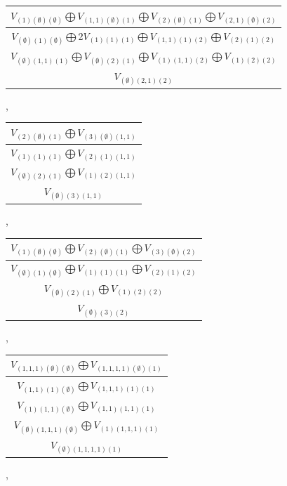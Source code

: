 \documentclass[letterpaper,11pt]{article}
\begin{document}
	\begin{tabular}{| c |}
		\hline
		$V_{(1)(\emptyset)(\emptyset)}$$\bigoplus$$V_{(1,1)(\emptyset)(1)}$$\bigoplus$$V_{(2)(\emptyset)(1)}$$\bigoplus$$V_{(2,1)(\emptyset)(2)}$\\
		\hline
		$V_{(\emptyset)(1)(\emptyset)}$$\bigoplus$2$V_{(1)(1)(1)}$$\bigoplus$$V_{(1,1)(1)(2)}$$\bigoplus$$V_{(2)(1)(2)}$\\
		\hline
		$V_{(\emptyset)(1,1)(1)}$$\bigoplus$$V_{(\emptyset)(2)(1)}$$\bigoplus$$V_{(1)(1,1)(2)}$$\bigoplus$$V_{(1)(2)(2)}$\\
		\hline
		$V_{(\emptyset)(2,1)(2)}$\\
		\hline
	\end{tabular}, 
	\begin{tabular}{| c |}
		\hline
		$V_{(2)(\emptyset)(1)}$$\bigoplus$$V_{(3)(\emptyset)(1,1)}$\\
		\hline
		$V_{(1)(1)(1)}$$\bigoplus$$V_{(2)(1)(1,1)}$\\
		\hline
		$V_{(\emptyset)(2)(1)}$$\bigoplus$$V_{(1)(2)(1,1)}$\\
		\hline
		$V_{(\emptyset)(3)(1,1)}$\\
		\hline
	\end{tabular}, 
	\begin{tabular}{| c |}
		\hline
		$V_{(1)(\emptyset)(\emptyset)}$$\bigoplus$$V_{(2)(\emptyset)(1)}$$\bigoplus$$V_{(3)(\emptyset)(2)}$\\
		\hline
		$V_{(\emptyset)(1)(\emptyset)}$$\bigoplus$$V_{(1)(1)(1)}$$\bigoplus$$V_{(2)(1)(2)}$\\
		\hline
		$V_{(\emptyset)(2)(1)}$$\bigoplus$$V_{(1)(2)(2)}$\\
		\hline
		$V_{(\emptyset)(3)(2)}$\\
		\hline
	\end{tabular}, 
	\begin{tabular}{| c |}
		\hline
		$V_{(1,1,1)(\emptyset)(\emptyset)}$$\bigoplus$$V_{(1,1,1,1)(\emptyset)(1)}$\\
		\hline
		$V_{(1,1)(1)(\emptyset)}$$\bigoplus$$V_{(1,1,1)(1)(1)}$\\
		\hline
		$V_{(1)(1,1)(\emptyset)}$$\bigoplus$$V_{(1,1)(1,1)(1)}$\\
		\hline
		$V_{(\emptyset)(1,1,1)(\emptyset)}$$\bigoplus$$V_{(1)(1,1,1)(1)}$\\
		\hline
		$V_{(\emptyset)(1,1,1,1)(1)}$\\
		\hline
	\end{tabular}, 
	\newline 
\end{document}
